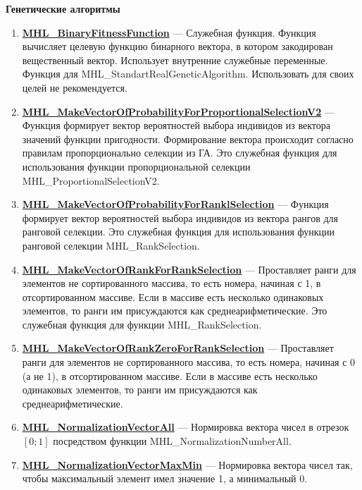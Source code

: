 \documentclass[a4paper,12pt]{article}
\begin{document}
\textbf{Генетические алгоритмы}
\begin{enumerate}

\item \textbf{\hyperref[MHL_BinaryFitnessFunction]{MHL\_BinaryFitnessFunction}} --- Служебная функция. Функция вычисляет целевую функцию бинарного вектора, в котором закодирован вещественный вектор. Использует внутренние служебные переменные. Функция для MHL\_StandartRealGeneticAlgorithm. Использовать для своих целей не рекомендуется.

\item \textbf{\hyperref[MHL_MakeVectorOfProbabilityForProportionalSelectionV2]{MHL\_MakeVectorOfProbabilityForProportionalSelectionV2}} --- Функция формирует вектор вероятностей выбора индивидов из вектора значений функции пригодности. Формирование вектора происходит согласно правилам пропорционально селекции из ГА. Это служебная функция для использования функции пропорциональной селекции MHL\_ProportionalSelectionV2.

\item \textbf{\hyperref[MHL_MakeVectorOfProbabilityForRanklSelection]{MHL\_MakeVectorOfProbabilityForRanklSelection}} --- Функция формирует вектор вероятностей выбора индивидов из вектора рангов для ранговой селекции. Это служебная функция для использования функции ранговой селекции MHL\_RankSelection.

\item \textbf{\hyperref[MHL_MakeVectorOfRankForRankSelection]{MHL\_MakeVectorOfRankForRankSelection}} --- Проставляет ранги для элементов не сортированного массива, то есть номера, начиная с 1, в отсортированном массиве.  Если в массиве есть несколько одинаковых элементов, то ранги им присуждаются как среднеарифметические. Это служебная функция для функции MHL\_RankSelection.

\item \textbf{\hyperref[MHL_MakeVectorOfRankZeroForRankSelection]{MHL\_MakeVectorOfRankZeroForRankSelection}} --- Проставляет ранги для элементов не сортированного массива, то есть номера, начиная с 0 (а не 1), в отсортированном массиве.  Если в массиве есть несколько одинаковых элементов, то ранги им присуждаются как среднеарифметические.

\item \textbf{\hyperref[MHL_NormalizationVectorAll]{MHL\_NormalizationVectorAll}} --- Нормировка вектора чисел в отрезок $[0;1]$ посредством функции MHL\_NormalizationNumberAll.

\item \textbf{\hyperref[MHL_NormalizationVectorMaxMin]{MHL\_NormalizationVectorMaxMin}} --- Нормировка вектора чисел так, чтобы максимальный элемент имел значение 1, а минимальный 0.


\end{enumerate}
\end{document}
